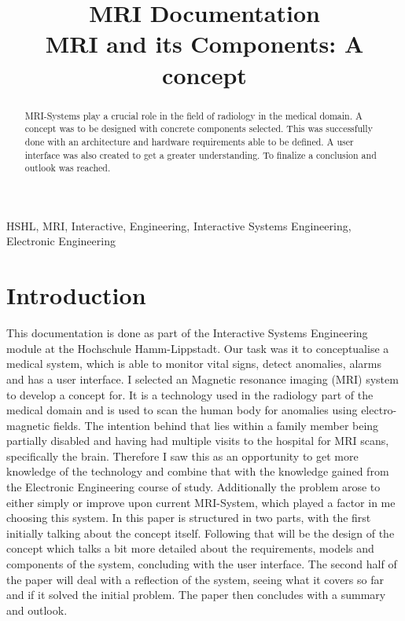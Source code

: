 \documentclass[conference]{IEEEtran}
\begin{document}
\title{MRI Documentation\\
{\footnotesize MRI and its Components: A concept}
}

\author{

}

\maketitle

\begin{abstract}
MRI-Systems play a crucial role in the field of radiology in the medical domain. A concept was to be designed with concrete components selected. This was successfully done with an architecture and hardware requirements able to be defined. A user interface was also created to get a greater understanding. To finalize a conclusion and outlook was reached.
\end{abstract}

\begin{IEEEkeywords}
HSHL, MRI, Interactive, Engineering, Interactive Systems Engineering, Electronic Engineering
\end{IEEEkeywords}
\tableofcontents
\section{Introduction}
    
    
    This documentation is done as part of the Interactive Systems Engineering module at the Hochschule Hamm-Lippstadt. Our task was it to conceptualise a medical system, which is able to monitor vital signs, detect anomalies, alarms and has a user interface.
    I selected an Magnetic resonance imaging (MRI) system to develop a concept for. It is a technology used in the radiology part of the medical domain and is used to scan the human body for anomalies using electro-magnetic fields.
    The intention behind that lies within a family member being partially disabled and having had multiple visits to the hospital for MRI scans, specifically the brain. Therefore I saw this as an opportunity to get more knowledge of the technology and combine that with the knowledge gained from the Electronic Engineering course of study. Additionally the problem arose to either simply or improve upon current MRI-System, which played a factor in me choosing this system.
    In this paper is structured in two parts, with the first initially talking about the concept itself. Following that will be the design of the concept which talks a bit more detailed about the requirements, models and components of the system, concluding with the user interface. The second half of the paper will deal with a reflection of the system, seeing what it covers so far and if it solved the initial problem. The paper then concludes with a summary and outlook.
    
\end{document}
